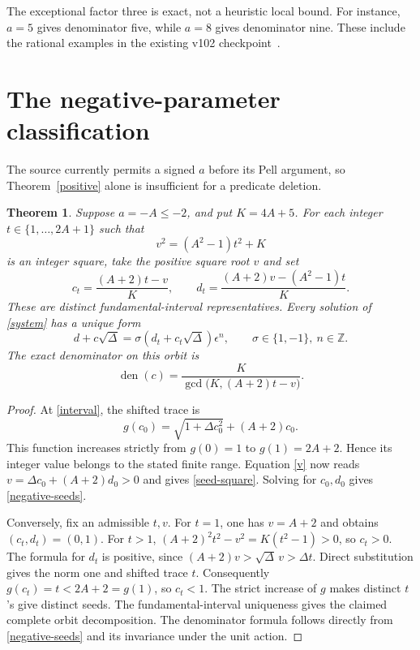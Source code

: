 \documentclass[11pt]{article}
\newtheorem{theorem}{Theorem}
\newcommand{\Z}{\mathbb Z}\newcommand{\Q}{\mathbb Q}
\begin{document}
The exceptional factor three is exact, not a heuristic local bound.
For instance, \(a=5\) gives denominator five, while \(a=8\) gives
denominator nine. These include the rational examples in the existing
v102 checkpoint~\cite{Obstruction}.

\section{The negative-parameter classification}

The source currently permits a signed \(a\) before its Pell argument,
so Theorem~\ref{positive} alone is insufficient for a predicate deletion.

\begin{theorem}\label{negative}
Suppose \(a=-A\le-2\), and put \(K=4A+5\). For each integer
\(t\in\{1,\ldots,2A+1\}\) such that
\begin{equation}\label{seed-square}
                       v^2=(A^2-1)t^2+K
\end{equation}
is an integer square, take the positive square root \(v\) and set
\begin{equation}\label{negative-seeds}
 c_t=\frac{(A+2)t-v}{K},\qquad
 d_t=\frac{(A+2)v-(A^2-1)t}{K}.
\end{equation}
These are distinct fundamental-interval representatives. Every solution
of \eqref{system} has a unique form
\[
       d+c\sqrt\Delta=\sigma(d_t+c_t\sqrt\Delta)\epsilon^n,
 \qquad \sigma\in\{1,-1\},\ n\in\Z.
\]
The exact denominator on this orbit is
\[
 \operatorname{den}(c)=
 \frac{K}{\gcd\bigl(K,(A+2)t-v\bigr)}.
\]
\end{theorem}
\begin{proof}
At \eqref{interval}, the shifted trace is
\[
 g(c_0)=\sqrt{1+\Delta c_0^2}+(A+2)c_0.
\]
This function increases strictly from \(g(0)=1\) to
\(g(1)=2A+2\). Hence its integer value belongs to the stated
finite range. Equation \eqref{v} now reads
\(v=\Delta c_0+(A+2)d_0>0\) and gives \eqref{seed-square}.
Solving for \(c_0,d_0\) gives \eqref{negative-seeds}.

Conversely, fix an admissible \(t,v\). For \(t=1\), one has
\(v=A+2\) and obtains \((c_t,d_t)=(0,1)\). For \(t>1\),
\((A+2)^2t^2-v^2=K(t^2-1)>0\), so \(c_t>0\).
The formula for \(d_t\) is positive, since
\((A+2)v>\sqrt\Delta\,v>\Delta t\).
Direct substitution gives the norm one and shifted trace \(t\).
Consequently \(g(c_t)=t<2A+2=g(1)\), so \(c_t<1\).
The strict increase of \(g\) makes distinct \(t\)'s give distinct
seeds. The fundamental-interval uniqueness gives the claimed complete
orbit decomposition. The denominator formula follows directly from
\eqref{negative-seeds} and its invariance under the unit action.
\end{proof}
\end{document}
